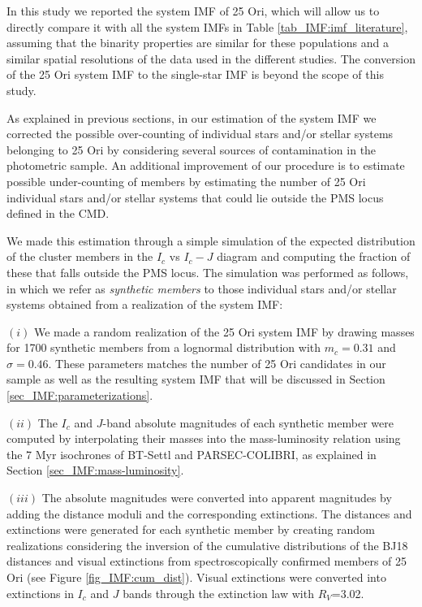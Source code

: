 \documentclass[12pt]{article}
\newcounter{subsubsubsection}[subsubsection]
\begin{document}
In this study we reported the system IMF of 25 Ori, which will allow us to directly compare it with all the system IMFs in Table \ref{tab_IMF:imf_literature}, assuming that the binarity properties are similar for these populations and a similar spatial resolutions of the data used in the different studies. The conversion of the 25 Ori system IMF to the single-star IMF is beyond the scope of this study.

\label{sec_IMF:missed}
As explained in previous sections, in our estimation of the system IMF we corrected the possible over-counting of individual stars and/or stellar systems belonging to 25 Ori by considering several sources of contamination in the photometric sample. An additional improvement of our procedure is to estimate possible under-counting of members by estimating the number of 25 Ori individual stars and/or stellar systems that could lie outside the PMS locus defined in the CMD.

We made this estimation through a simple simulation of the expected distribution of the cluster members in the $I_c$ vs $I_c-J$ diagram and computing the fraction of these that falls outside the PMS locus. The simulation was performed as follows, in which we refer as \emph{synthetic members} to those individual stars and/or stellar systems obtained from a realization of the system IMF:

$(i)$ We made a random realization of the 25 Ori system IMF by drawing masses for 1700 synthetic members from a lognormal distribution with $m_c=0.31$ and $\sigma=0.46$. These parameters matches the number of 25 Ori candidates in our sample as well as the resulting system IMF that will be discussed in Section \ref{sec_IMF:parameterizations}. 

$(ii)$ The $I_c$ and $J$-band absolute magnitudes of each synthetic member were computed by interpolating their masses into the mass-luminosity relation using the 7 Myr isochrones of BT-Settl and PARSEC-COLIBRI, as explained in Section \ref{sec_IMF:mass-luminosity}.

$(iii)$ The absolute magnitudes were converted into apparent magnitudes by adding the distance moduli and the corresponding extinctions. The distances and extinctions were generated for each synthetic member by creating random realizations considering the inversion of the cumulative distributions of the BJ18 distances and visual extinctions from spectroscopically confirmed members of 25 Ori (see Figure \ref{fig_IMF:cum_dist}). Visual extinctions were converted into extinctions in $I_c$ and $J$ bands through the \cite{Rieke-Lebofsky1985} extinction law with $R_V$=3.02.
\end{document}
